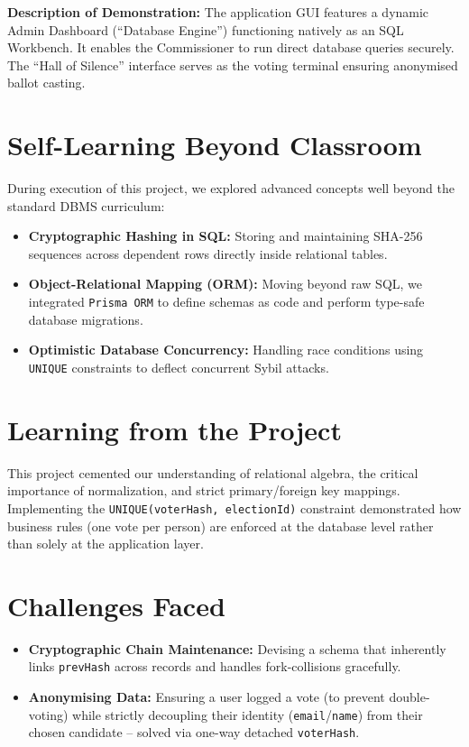 \documentclass[12pt, a4paper]{article}
\begin{document}
\textbf{Description of Demonstration:} The application GUI features a dynamic Admin Dashboard (``Database Engine'') functioning natively as an SQL Workbench. It enables the Commissioner to run direct database queries securely. The ``Hall of Silence'' interface serves as the voting terminal ensuring anonymised ballot casting.

\section{Self-Learning Beyond Classroom}
During execution of this project, we explored advanced concepts well beyond the standard DBMS curriculum:
\begin{itemize}
    \item \textbf{Cryptographic Hashing in SQL:} Storing and maintaining SHA-256 sequences across dependent rows directly inside relational tables.
    \item \textbf{Object-Relational Mapping (ORM):} Moving beyond raw SQL, we integrated \texttt{Prisma ORM} to define schemas as code and perform type-safe database migrations.
    \item \textbf{Optimistic Database Concurrency:} Handling race conditions using \texttt{UNIQUE} constraints to deflect concurrent Sybil attacks.
\end{itemize}

\section{Learning from the Project}
This project cemented our understanding of relational algebra, the critical importance of normalization, and strict primary/foreign key mappings. Implementing the \texttt{UNIQUE(voterHash, electionId)} constraint demonstrated how business rules (one vote per person) are enforced at the database level rather than solely at the application layer.

\section{Challenges Faced}
\begin{itemize}
    \item \textbf{Cryptographic Chain Maintenance:} Devising a schema that inherently links \texttt{prevHash} across records and handles fork-collisions gracefully.
    \item \textbf{Anonymising Data:} Ensuring a user logged a vote (to prevent double-voting) while strictly decoupling their identity (\texttt{email}/\texttt{name}) from their chosen candidate -- solved via one-way detached \texttt{voterHash}.
\end{itemize}
\end{document}
